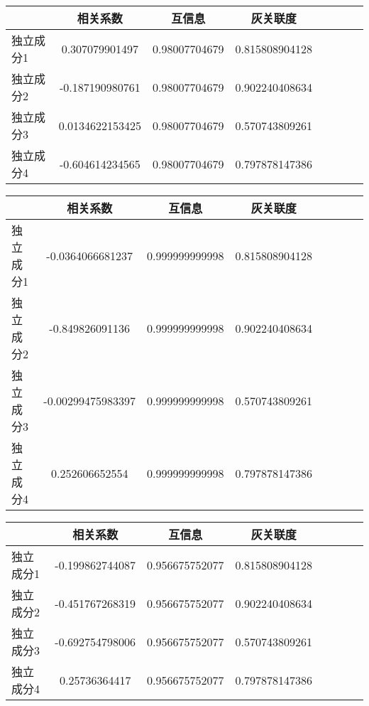 \begin{table}[!htbp] 
\begin{center}
\begin{tabular}{lccclccc} 
 \toprule 
& 相关系数   & 互信息    &灰关联度 \\ 
\midrule 
独立成分1	& 0.307079901497	& 0.98007704679	& 0.815808904128	\\ 
独立成分2	& -0.187190980761	& 0.98007704679	& 0.902240408634	\\ 
独立成分3	& 0.0134622153425	& 0.98007704679	& 0.570743809261	\\ 
独立成分4	& -0.604614234565	& 0.98007704679	& 0.797878147386	\\ 
\bottomrule 
 \end{tabular} 
\end{center} 
 \end{table} 


\begin{table}[!htbp] 
\begin{center}
\begin{tabular}{lccclccc} 
 \toprule 
& 相关系数   & 互信息    &灰关联度 \\ 
\midrule 
独立成分1	& -0.0364066681237	& 0.999999999998	& 0.815808904128	\\ 
独立成分2	& -0.849826091136	& 0.999999999998	& 0.902240408634	\\ 
独立成分3	& -0.00299475983397	& 0.999999999998	& 0.570743809261	\\ 
独立成分4	& 0.252606652554	& 0.999999999998	& 0.797878147386	\\ 
\bottomrule 
 \end{tabular} 
\end{center} 
 \end{table} 


\begin{table}[!htbp] 
\begin{center}
\begin{tabular}{lccclccc} 
 \toprule 
& 相关系数   & 互信息    &灰关联度 \\ 
\midrule 
独立成分1	& -0.199862744087	& 0.956675752077	& 0.815808904128	\\ 
独立成分2	& -0.451767268319	& 0.956675752077	& 0.902240408634	\\ 
独立成分3	& -0.692754798006	& 0.956675752077	& 0.570743809261	\\ 
独立成分4	& 0.25736364417	& 0.956675752077	& 0.797878147386	\\ 
\bottomrule 
 \end{tabular} 
\end{center} 
 \end{table} 


